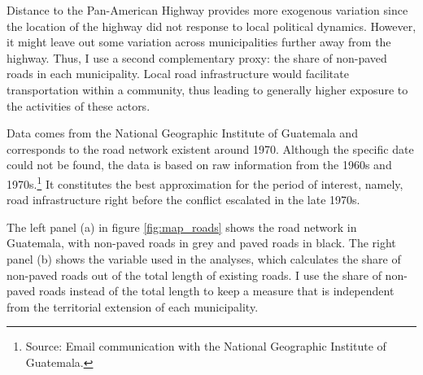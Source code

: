 \documentclass[12pt, notitlepage]{article}
\begin{document}
Distance to the Pan-American Highway provides more exogenous variation since the location of the highway did not response to local political dynamics.
However, it might leave out some variation across municipalities further away from the highway.
Thus, I use a second complementary proxy: the share of non-paved roads in each municipality.
Local road infrastructure would facilitate transportation within a community, thus leading to generally higher exposure to the activities of these actors.

Data comes from the National Geographic Institute of Guatemala \citep{Segeplan:2019aa} and corresponds to the road network existent around 1970.
Although the specific date could not be found, the data is based on raw information from the 1960s and 1970s.\footnote{Source: Email communication with the National Geographic Institute of Guatemala.}
It constitutes the best approximation for the period of interest, namely, road infrastructure right before the conflict escalated in the late 1970s.

The left panel (a) in figure \ref{fig:map_roads} shows the road network in Guatemala, with non-paved roads in grey and paved roads in black.
The right panel (b) shows the variable used in the analyses, which calculates the share of non-paved roads out of the total length of existing roads.
I use the share of non-paved roads instead of the total length to keep a measure that is independent from the territorial extension of each municipality.
\end{document}
